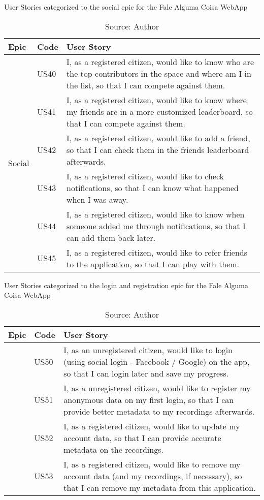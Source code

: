 \begin{table}[h]
\caption{User Stories categorized to the social epic for the Fale Alguma Coisa WebApp}
\label{tab:falealgumacoisa-social-epic}
\centering
\begin{tabular}{|p{2cm}|p{1cm}|p{10cm}|}
\hline
Epic & Code & User Story \\ \hline
\multirow{6}{*}{Social}
    & US40 & I, as a registered citizen, would like to know who are the top contributors in the space and where am I in the list, so that I can compete against them. \\ \cline{2-3} 
    & US41 & I, as a registered citizen, would like to know where my friends are in a more customized leaderboard, so that I can compete against them. \\ \cline{2-3} 
    & US42 & I, as a registered citizen, would like to add a friend, so that I can check them in the friends leaderboard afterwards. \\ \cline{2-3} 
    & US43 & I, as a registered citizen, would like to check notifications, so that I can know what happened when I was away. \\ \cline{2-3} 
    & US44 & I, as a registered citizen, would like to know when someone added me through notifications, so that I can add them back later. \\ \cline{2-3} 
    & US45 & I, as a registered citizen, would like to refer friends to the application, so that I can play with them. \\ \hline
\end{tabular}
\caption*{Source: Author}
\end{table}

\begin{table}[h]
\caption{User Stories categorized to the login and registration epic for the Fale Alguma Coisa WebApp}
\label{tab:falealgumacoisa-login-and-registration-epic}
\centering
\begin{tabular}{|p{3cm}|p{1cm}|p{10cm}|}
\hline
Epic & Code & User Story \\ \hline
{} 
    & US50 & I, as an unregistered citizen, would like to login (using social login - Facebook / Google) on the app, so that I can login later and save my progress. \\  
    & US51 & I, as a unregistered citizen, would like to register my anonymous data on my first login, so that I can provide better metadata to my recordings afterwards. \\  
    & US52 & I, as a registered citizen, would like to update my account data, so that I can provide accurate metadata on the recordings. \\  
    & US53 & I, as a registered citizen, would like to remove my account data (and my recordings, if necessary), so that I can remove my metadata from this application. \\ \hline
\end{tabular}
\caption*{Source: Author}
\end{table}

